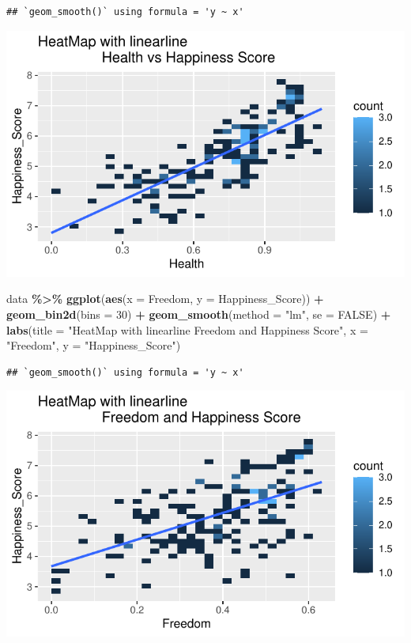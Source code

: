 \documentclass[
  11pt,
]{article}
\newenvironment{Shaded}{\begin{snugshade}}{\end{snugshade}}
\newcommand{\AttributeTok}[1]{\textcolor[rgb]{0.13,0.29,0.53}{#1}}
\newcommand{\ConstantTok}[1]{\textcolor[rgb]{0.56,0.35,0.01}{#1}}
\newcommand{\DecValTok}[1]{\textcolor[rgb]{0.00,0.00,0.81}{#1}}
\newcommand{\FunctionTok}[1]{\textcolor[rgb]{0.13,0.29,0.53}{\textbf{#1}}}
\newcommand{\NormalTok}[1]{#1}
\newcommand{\SpecialCharTok}[1]{\textcolor[rgb]{0.81,0.36,0.00}{\textbf{#1}}}
\newcommand{\StringTok}[1]{\textcolor[rgb]{0.31,0.60,0.02}{#1}}
\begin{document}
\begin{verbatim}
## `geom_smooth()` using formula = 'y ~ x'
\end{verbatim}

\begin{center}\includegraphics[width=0.7\linewidth]{Group_project_2_files/figure-latex/unnamed-chunk-16-1} \end{center}

\begin{Shaded}
\begin{Highlighting}[]
\NormalTok{data }\SpecialCharTok{\%\textgreater{}\%}
\FunctionTok{ggplot}\NormalTok{(}\FunctionTok{aes}\NormalTok{(}\AttributeTok{x =}\NormalTok{ Freedom, }\AttributeTok{y =}\NormalTok{ Happiness\_Score)) }\SpecialCharTok{+}
  \FunctionTok{geom\_bin2d}\NormalTok{(}\AttributeTok{bins =} \DecValTok{30}\NormalTok{) }\SpecialCharTok{+}  
  \FunctionTok{geom\_smooth}\NormalTok{(}\AttributeTok{method =} \StringTok{"lm"}\NormalTok{, }\AttributeTok{se =} \ConstantTok{FALSE}\NormalTok{) }\SpecialCharTok{+} 
  \FunctionTok{labs}\NormalTok{(}\AttributeTok{title =} \StringTok{"HeatMap with linearline }
\StringTok{                Freedom and Happiness Score"}\NormalTok{, }
           \AttributeTok{x =} \StringTok{"Freedom"}\NormalTok{, }\AttributeTok{y =} \StringTok{"Happiness\_Score"}\NormalTok{)}
\end{Highlighting}
\end{Shaded}

\begin{verbatim}
## `geom_smooth()` using formula = 'y ~ x'
\end{verbatim}

\begin{center}\includegraphics[width=0.7\linewidth]{Group_project_2_files/figure-latex/unnamed-chunk-17-1} \end{center}
\end{document}
